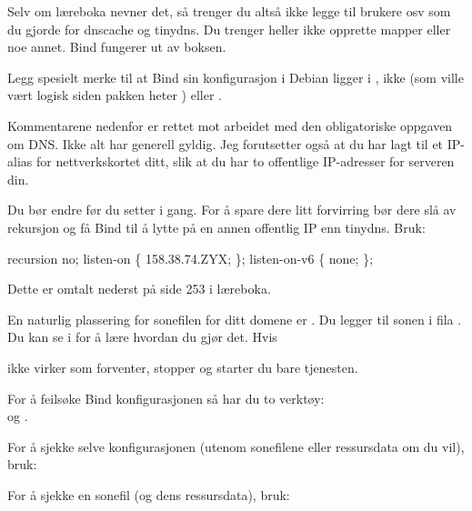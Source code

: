 \begin{remark}
Selv om læreboka nevner det, så trenger du altså ikke legge til brukere osv 
som du gjorde for dnscache og tinydns. Du trenger heller ikke opprette mapper eller noe annet.
Bind fungerer ut av boksen.
\end{remark}

Legg spesielt merke til at Bind sin konfigurasjon i Debian ligger i , 
ikke  (som ville vært logisk siden pakken heter ) 
eller . 

Kommentarene nedenfor er rettet mot arbeidet med den obligatoriske oppgaven
om DNS. Ikke alt har generell gyldig. Jeg forutsetter også at du har lagt
til et IP-alias for nettverkskortet ditt, slik at du har to offentlige IP-adresser
for serveren din. 

Du bør endre  før du setter i gang.
For å spare dere litt forvirring bør dere slå av rekursjon og få Bind til å lytte 
på en annen offentlig IP enn tinydns. Bruk:

\begin{filedata}
recursion no;
listen-on \{ 158.38.74.ZYX; \};
listen-on-v6 \{ none; \};
\end{filedata}

Dette er omtalt nederst på side 253 i læreboka. 

En naturlig plassering for sonefilen for ditt domene er 
.  
Du legger til sonen i fila . 
Du kan se i  for 
å lære hvordan du gjør det. Hvis 


ikke virker som forventer, stopper og starter du bare tjenesten.

For å feilsøke Bind konfigurasjonen så har du to verktøy: \\ 
 og .

For å sjekke selve konfigurasjonen (utenom sonefilene eller ressursdata om du vil), bruk:


For å sjekke en sonefil (og dens ressursdata), bruk:


